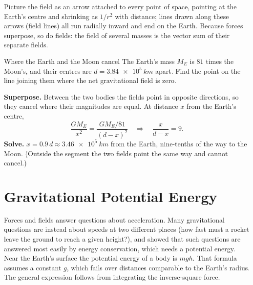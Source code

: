 Picture the field as an arrow attached to every point of space, pointing at the Earth's centre and
shrinking as $1/r^2$ with distance; lines drawn along these arrows (field lines) all run radially inward
and end on the Earth. Because forces superpose, so do fields: the field of several masses is the vector
sum of their separate fields.

\begin{exbox}{Where the Earth and the Moon cancel}
The Earth's mass $M_E$ is $81$ times the Moon's, and their centres are $d=\SI{3.84e5}{km}$ apart. Find the point
on the line joining them where the net gravitational field is zero.

 \textbf{Superpose.} Between the two bodies the fields point in opposite directions, so they
cancel where their magnitudes are equal. At distance $x$ from the Earth's centre,
\[
\frac{GM_E}{x^2}=\frac{GM_E/81}{(d-x)^2}\quad\Longrightarrow\quad\frac{x}{d-x}=9 .
\]
 \textbf{Solve.} $x=0.9\,d\approx\SI{3.46e5}{km}$ from the Earth, nine-tenths of the way to the
Moon. (Outside the segment the two fields point the same way and cannot cancel.) 
\end{exbox}


\section{Gravitational Potential Energy}\label{sec:gpe}

Forces and fields answer questions about acceleration. Many gravitational questions are instead about
speeds at two different places (how fast must a rocket leave the ground to reach a given height?), and
 showed that such questions are answered most easily by energy conservation, which
needs a potential energy. Near the Earth's surface the potential energy of a body is $mgh$. That
formula assumes a constant $g$, which fails over distances comparable to the Earth's radius. The general
expression follows from integrating the inverse-square force.

